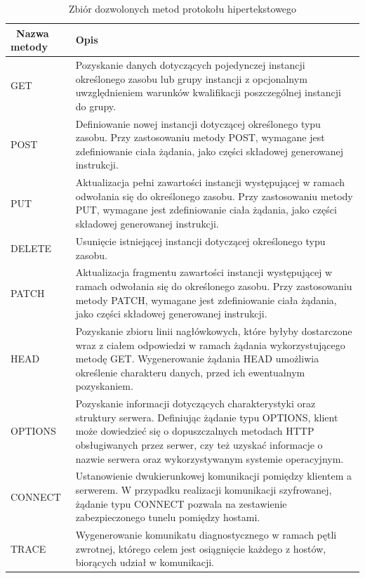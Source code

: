 \begin{table}[htbp] \small
\centering
\caption{Zbiór dozwolonych metod protokołu hipertekstowego}
\label{tab:metody-http}
\begin{tabularx}{\linewidth}{|p{3cm}|X|} \hline\
Nazwa metody & Opis \\ \hline\hline
GET & Pozyskanie danych dotyczących pojedynczej instancji określonego zasobu lub grupy instancji z opcjonalnym uwzględnieniem warunków kwalifikacji poszczególnej instancji do grupy. \\ \hline
POST & Definiowanie nowej instancji dotyczącej określonego typu zasobu. Przy zastosowaniu metody POST, wymagane jest zdefiniowanie ciała żądania, jako części składowej generowanej instrukcji. \\ \hline
PUT & Aktualizacja pełni zawartości instancji występującej w ramach odwołania się do określonego zasobu. Przy zastosowaniu metody PUT, wymagane jest zdefiniowanie ciała żądania, jako części składowej generowanej instrukcji. \\ \hline
DELETE & Usunięcie istniejącej instancji dotyczącej określonego typu zasobu. \\ \hline
PATCH & Aktualizacja fragmentu zawartości instancji występującej w ramach odwołania się do określonego zasobu. Przy zastosowaniu metody PATCH, wymagane jest zdefiniowanie ciała żądania, jako części składowej generowanej instrukcji. \\ \hline
HEAD & Pozyskanie zbioru linii nagłówkowych, które byłyby dostarczone wraz z ciałem odpowiedzi w ramach żądania wykorzystującego metodę GET. Wygenerowanie żądania HEAD umożliwia określenie charakteru danych, przed ich ewentualnym pozyskaniem. \\ \hline
OPTIONS & Pozyskanie informacji dotyczących charakterystyki oraz struktury serwera. Definiując żądanie typu OPTIONS, klient może dowiedzieć się o dopuszczalnych metodach HTTP obsługiwanych przez serwer, czy też uzyskać informacje o nazwie serwera oraz wykorzystywanym systemie operacyjnym. \\ \hline
CONNECT & Ustanowienie dwukierunkowej komunikacji pomiędzy klientem a serwerem. W przypadku realizacji komunikacji szyfrowanej, żądanie typu CONNECT pozwala na zestawienie zabezpieczonego tunelu pomiędzy hostami. \\ \hline
TRACE & Wygenerowanie komunikatu diagnostycznego w ramach pętli zwrotnej, którego celem jest osiągnięcie każdego z hostów, biorących udział w komunikacji. \\ \hline
\end{tabularx}
\end{table}

